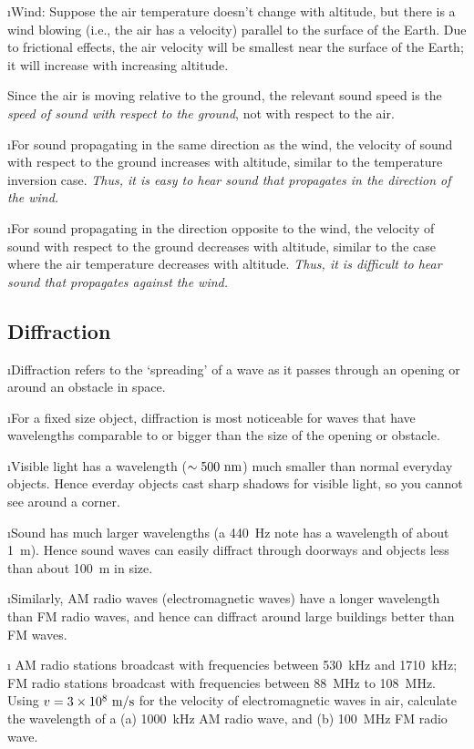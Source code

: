 \i Wind: 
Suppose the air temperature doesn't change with 
altitude, but there is a wind blowing (i.e., the air 
has a velocity) parallel to the surface of the Earth.
Due to frictional effects, the air velocity will 
be smallest near the surface of the Earth; 
it will increase with increasing altitude.

Since the air is moving relative to the ground,
the relevant sound speed is the {\em speed of sound 
with respect to the ground}, not with respect to 
the air.

\i \ex For sound propagating in the same direction 
as the wind, the velocity of sound with respect to the ground 
increases with altitude, similar to the temperature inversion case.
{\em Thus, it is easy to hear sound that propagates 
in the direction of the wind.}

\i \ex For sound propagating in the direction opposite 
to the wind, the velocity of sound with respect to the ground 
decreases with altitude, similar to 
the case where the air temperature decreases with altitude.
{\em Thus, it is difficult to hear sound that propagates
against the wind.}


\ei
\subsection{Diffraction}
\bi

\i Diffraction refers to the `spreading' of a wave as
it passes through an opening or around an obstacle 
in space.

\i For a fixed size object, diffraction is most noticeable
for waves that have wavelengths comparable to or bigger
than the size of the opening or obstacle.

\i Visible light has a wavelength ($\sim 500~{\rm nm}$)
much smaller than normal everyday objects.
Hence everday objects cast sharp shadows for visible
light, so you cannot see around a corner.

\i Sound has much larger wavelengths (a 440~Hz note
has a wavelength of about 1~m).
Hence sound waves can easily diffract through doorways
and objects less than about 100~m in size.

\i Similarly, AM radio waves (electromagnetic waves) 
have a longer 
wavelength than FM radio waves, and hence can diffract 
around large buildings better than FM waves.

\i \exer
AM radio stations broadcast with frequencies between 530~kHz and 1710~kHz;
FM radio stations broadcast with frequencies between 88~MHz to 108~MHz.
Using $v=3\times 10^8~{\rm m/s}$ for the velocity of 
electromagnetic waves in air, calculate the wavelength of a
(a) 1000~kHz AM radio wave, and 
(b) 100~MHz FM radio wave.


